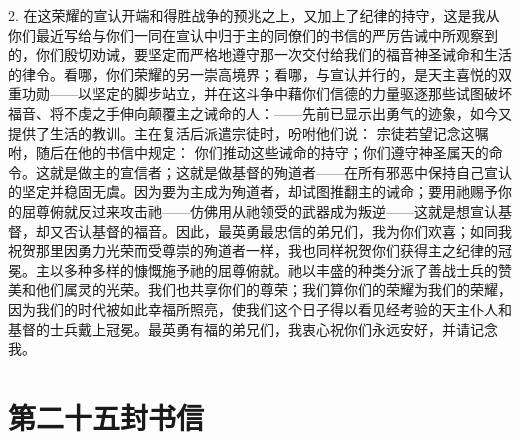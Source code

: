 2. 在这荣耀的宣认开端和得胜战争的预兆之上，又加上了纪律的持守，这是我从你们最近写给与你们一同在宣认中归于主的同僚们的书信的严厉告诫中所观察到的，你们殷切劝诫，要坚定而严格地遵守那一次交付给我们的福音神圣诫命和生活的律令。看哪，你们荣耀的另一崇高境界；看哪，与宣认并行的，是天主喜悦的双重功勋——以坚定的脚步站立，并在这斗争中藉你们信德的力量驱逐那些试图破坏福音、将不虔之手伸向颠覆主之诫命的人：——先前已显示出勇气的迹象，如今又提供了生活的教训。主在复活后派遣宗徒时，吩咐他们说： 宗徒若望记念这嘱咐，随后在他的书信中规定： 你们推动这些诫命的持守；你们遵守神圣属天的命令。这就是做主的宣信者；这就是做基督的殉道者——在所有邪恶中保持自己宣认的坚定并稳固无虞。因为要为主成为殉道者，却试图推翻主的诫命；要用祂赐予你的屈尊俯就反过来攻击祂——仿佛用从祂领受的武器成为叛逆——这就是想宣认基督，却又否认基督的福音。因此，最英勇最忠信的弟兄们，我为你们欢喜；如同我祝贺那里因勇力光荣而受尊崇的殉道者一样，我也同样祝贺你们获得主之纪律的冠冕。主以多种多样的慷慨施予祂的屈尊俯就。祂以丰盛的种类分派了善战士兵的赞美和他们属灵的光荣。我们也共享你们的尊荣；我们算你们的荣耀为我们的荣耀，因为我们的时代被如此幸福所照亮，使我们这个日子得以看见经考验的天主仆人和基督的士兵戴上冠冕。最英勇有福的弟兄们，我衷心祝你们永远安好，并请记念我。\par



\section{第二十五封书信}

\par

\par

